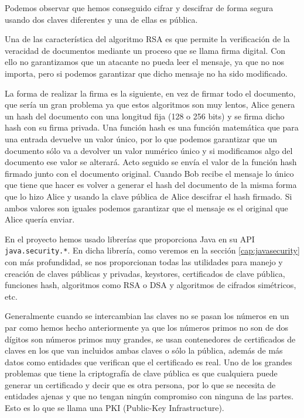Podemos observar que hemos conseguido cifrar y descifrar de forma segura usando dos claves diferentes y una de ellas es pública.

Una de las característica del algoritmo RSA es que permite la verificación de la veracidad de documentos mediante un proceso que se llama firma digital. Con ello no garantizamos que un atacante no pueda leer el mensaje, ya que no nos importa, pero si podemos garantizar que dicho mensaje no ha sido modificado. 

La forma de realizar la firma es la siguiente, en vez de firmar todo el documento, que sería un gran problema ya que estos algoritmos son muy lentos, Alice genera un hash del documento con una longitud fija (128 o 256 bits) y se firma dicho hash con su firma privada. Una función hash es una función matemática que para una entrada devuelve un valor único, por lo que podemos garantizar que un documento sólo va a devolver un valor numérico único y si modificamos algo del documento ese valor se alterará. Acto seguido se envía el valor de la función hash firmado junto con el documento original. Cuando Bob recibe el mensaje lo único que tiene que hacer es volver a generar el hash del documento de la misma forma que lo hizo Alice y usando la clave pública de Alice descifrar el hash firmado. Si ambos valores son iguales podemos garantizar que el mensaje es el original que Alice quería enviar.

En el proyecto hemos usado librerías que proporciona Java en su API \lstinline{java.security.*}. En dicha librería, como veremos en la sección \ref{cap:javasecurity} con más profundidad, se nos proporcionan todas las utilidades para manejo y creación de claves públicas y privadas, keystores, certificados de clave pública, funciones hash, algoritmos como RSA o DSA y algoritmos de cifrados simétricos, etc. 

Generalmente cuando se intercambian las claves no se pasan los números en un par como hemos hecho anteriormente ya que los números primos no son de dos dígitos son números primos muy grandes, se usan contenedores de certificados de claves en los que van incluidos ambas claves o sólo la pública, además de más datos como entidades que verifican que el certificado es real. Uno de los grandes problemas que tiene la criptografía de clave pública es que cualquiera puede generar un certificado y decir que es otra persona, por lo que se necesita de entidades ajenas y que no tengan ningún compromiso con ninguna de las partes. Esto es lo que se llama una PKI (Public-Key Infrastructure).

